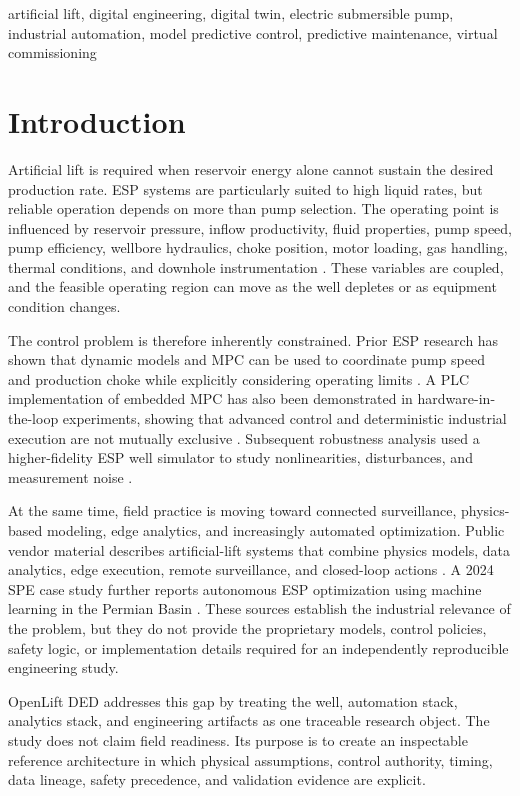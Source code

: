 \documentclass[conference]{IEEEtran}
\begin{document}
\begin{IEEEkeywords}
artificial lift, digital engineering, digital twin, electric submersible pump, industrial automation, model predictive control, predictive maintenance, virtual commissioning
\end{IEEEkeywords}

\section{Introduction}
Artificial lift is required when reservoir energy alone cannot sustain the desired production rate. ESP systems are particularly suited to high liquid rates, but reliable operation depends on more than pump selection. The operating point is influenced by reservoir pressure, inflow productivity, fluid properties, pump speed, pump efficiency, wellbore hydraulics, choke position, motor loading, gas handling, thermal conditions, and downhole instrumentation \cite{takacs2018}. These variables are coupled, and the feasible operating region can move as the well depletes or as equipment condition changes.

The control problem is therefore inherently constrained. Prior ESP research has shown that dynamic models and MPC can be used to coordinate pump speed and production choke while explicitly considering operating limits \cite{pavlov2014,binder2014}. A PLC implementation of embedded MPC has also been demonstrated in hardware-in-the-loop experiments, showing that advanced control and deterministic industrial execution are not mutually exclusive \cite{binder2014}. Subsequent robustness analysis used a higher-fidelity ESP well simulator to study nonlinearities, disturbances, and measurement noise \cite{krishnamoorthy2016}.

At the same time, field practice is moving toward connected surveillance, physics-based modeling, edge analytics, and increasingly automated optimization. Public vendor material describes artificial-lift systems that combine physics models, data analytics, edge execution, remote surveillance, and closed-loop actions \cite{slb-intelligent,slb-loa,slb-liftiq}. A 2024 SPE case study further reports autonomous ESP optimization using machine learning in the Permian Basin \cite{erickson2024}. These sources establish the industrial relevance of the problem, but they do not provide the proprietary models, control policies, safety logic, or implementation details required for an independently reproducible engineering study.

OpenLift DED addresses this gap by treating the well, automation stack, analytics stack, and engineering artifacts as one traceable research object. The study does not claim field readiness. Its purpose is to create an inspectable reference architecture in which physical assumptions, control authority, timing, data lineage, safety precedence, and validation evidence are explicit.
\end{document}
